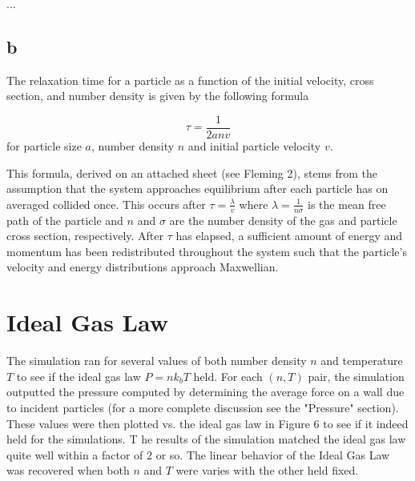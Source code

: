 \documentclass[12pt]{amsart}
\begin{document}
...


\subsection{b}

The relaxation time for a particle as a function of the initial velocity, cross section, and number density is given by the following formula

$$ \tau = \frac{1}{2anv} $$
\newline
for particle size $a$, number density $n$ and initial particle velocity $v$.
\newline
\par This formula, derived on an attached sheet (see Fleming 2), stems from the assumption that the system approaches equilibrium after each particle has on averaged collided once.  This occurs after $\tau = \frac{\lambda}{v}$ where $\lambda = \frac{1}{n\sigma}$ is the mean free path of the particle and $n$ and $\sigma$ are the number density of the gas and particle cross section, respectively.  After $\tau$ has elapsed, a sufficient amount of energy and momentum has been redistributed throughout the system such that the particle's velocity and energy distributions approach Maxwellian.


\section{Ideal Gas Law}

The simulation ran for several values of both number density $n$ and temperature $T$ to see if the ideal gas law $P=nk_bT$ held.  For each $(n,T)$ pair, the simulation outputted the pressure computed by determining the average force on a wall due to incident particles (for a more complete discussion see the "Pressure" section).  These values were then plotted vs. the ideal gas law in Figure 6 to see if it indeed held for the simulations. T he results of the simulation matched the ideal gas law quite well within a factor of 2 or so. The linear behavior of the Ideal Gas Law was recovered when both $n$ and $T$ were varies with the other held fixed. 
\end{document}
